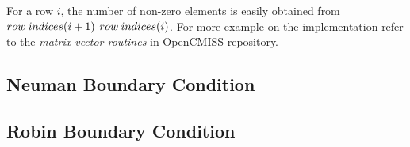  
For a row $i$, the number of non-zero elements is easily obtained from $row \hspace{0.8mm} indices(i+1)$-$row \hspace{0.8mm} indices(i)$. For more example on the implementation
 refer to the \textit{matrix vector routines} in OpenCMISS repository.

\subsection{Neuman Boundary Condition}

\subsection{Robin Boundary Condition}
